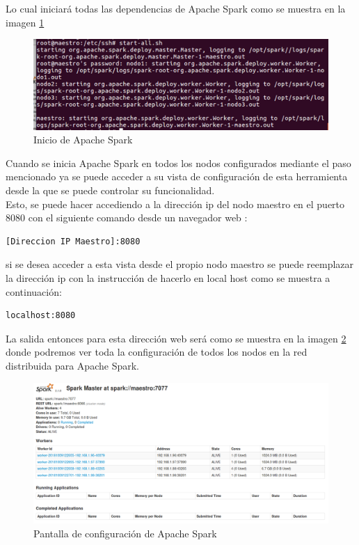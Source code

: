 Lo cual iniciará todas las dependencias de Apache Spark como se muestra en la imagen \ref{fig:iniciaspark}
\begin{figure}[H]
	\hypertarget{fig:iniciaspark}{\hspace{1pt}}
	\begin{center}	
		\includegraphics[width=.7\textwidth]{capitulo5/images/im27.png}
		\caption{Inicio de Apache Spark}
		\label{fig:iniciaspark}
	\end{center}
\end{figure}
Cuando se inicia Apache Spark en todos los nodos configurados mediante el paso mencionado ya se puede acceder a su vista de configuración de esta herramienta desde la que se puede controlar su funcionalidad.
\\
Esto, se puede hacer accediendo a la dirección ip del nodo maestro en el puerto 8080 con el siguiente comando desde un navegador web :
\begin{verbatim}
[Direccion IP Maestro]:8080
\end{verbatim}
si se desea acceder a esta vista desde el propio nodo maestro se puede reemplazar la dirección ip con la instrucción de hacerlo en local host como se muestra a continuación:
\begin{verbatim}
localhost:8080
\end{verbatim}
La salida entonces para esta dirección web será como se muestra en la imagen \ref{fig:salida} donde podremos ver toda la configuración de todos los nodos en la red distribuida para Apache Spark. 
\begin{figure}[H]
	\hypertarget{fig:salida}{\hspace{1pt}}
	\begin{center}	
		\includegraphics[width=.7\textwidth]{capitulo5/images/im28.png}
		\caption{Pantalla de configuración de Apache Spark}
		\label{fig:salida}
	\end{center}
\end{figure}

